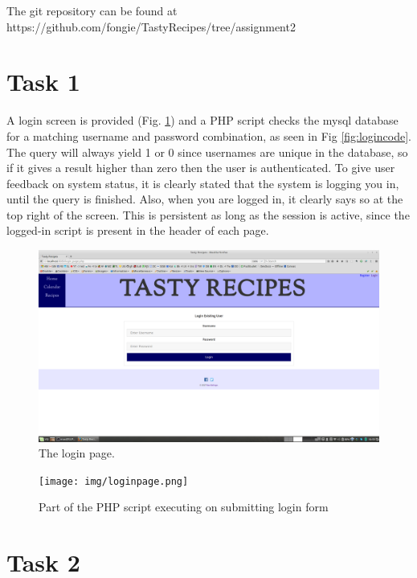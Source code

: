 \documentclass[a4paper]{scrreprt}
\begin{document}
The git repository can be found at https://github.com/fongie/TastyRecipes/tree/assignment2

\section{Task 1}

A login screen is provided (Fig. \ref{fig:login}) and a PHP script checks the mysql database for a matching username and password combination, as seen in Fig \ref{fig:logincode}. The query will always yield 1 or 0 since usernames are unique in the database, so if it gives a result higher than zero then the user is authenticated. To give user feedback on system status, it is clearly stated that the system is logging you in, until the query is finished. Also, when you are logged in, it clearly says so at the top right of the screen. This is persistent as long as the session is active, since the logged-in script is present in the header of each page.

\begin{figure}[h!]
  \begin{center}
    \includegraphics[scale=0.41]{img/login.png}
    \caption{The login page.}
    \label{fig:login}
  \end{center}
\end{figure}

\begin{figure}[h!]
  \begin{center}
    \texttt{[image: img/loginpage.png]}
    \caption{Part of the PHP script executing on submitting login form}
    \label{fig:loginpage}
  \end{center}
\end{figure}

\section{Task 2}
\end{document}
